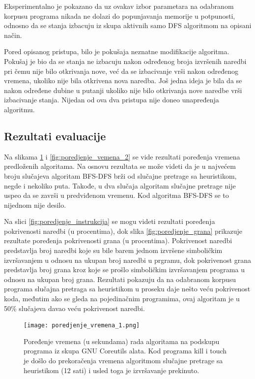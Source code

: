 \documentclass[12pt,oneside]{memoir}
\begin{document}
Eksperimentalno je pokazano da uz ovakav izbor parametara na odabranom korpusu programa nikada ne dolazi do popunjavanja memorije u potpunosti, odnosno da se stanja izbacuju iz skupa aktivnih samo DFS algoritmom na opisani način.

Pored opisanog pristupa, bilo je pokušaja neznatne modifikacije algoritma. Pokušaj je bio da se stanja ne izbacuju nakon određenog broja izvršenih naredbi pri čemu nije bilo otkrivanja nove, već da se izbacivanje vrši nakon određenog vremena, ukoliko nije bila otkrivena nova naredba. Još jedna ideja je bila da se nakon određene dubine u putanji ukoliko nije bilo otkrivanja nove naredbe vrši izbacivanje stanja. Nijedan od ova dva pristupa nije doneo unapređenja algoritmu.

\subsection{Rezultati evaluacije}

Na slikama \ref{fig:poredjenje_vemena_1} i \ref{fig:poredjenje_vemena_2} se vide rezultati poređenja vremena predloženih algoritama. Na osnovu rezultata se može videti da je u najvećem broju slučajeva algoritam BFS-DFS brži od slučajne pretrage sa heuristikom, negde i nekoliko puta. Takođe, u dva slučaja algoritam slučajne pretrage nije uspeo da se završi u predviđenom vremenu. Kod algoritma BFS-DFS se to nijednom nije desilo. 

Na slici \ref{fig:poredjenje_instrukcija} se mogu videti rezultati poređenja pokrivenosti naredbi (u procentima), dok slika \ref{fig:poredjenje_grana} prikazuje rezultate poređenja pokrivenosti grana (u procentima). Pokrivenost naredbi predstavlja broj naredbi koje su bile barem jednom izvršene simboličkim izvršavanjem u odnosu na ukupan broj naredbi u prgramu, dok pokrivenost grana predstavlja broj grana kroz koje se prošlo simboličkim izvršavanjem programa u odnosu na ukupan broj grana. Rezultati pokazuju da na odabranom korpusu programa slučajna pretraga sa heuristikom u proseku daje nešto veću pokrivenost koda, međutim ako se gleda na pojedinačnim programima, ovaj algoritam je u 50\% slučajeva davao veću pokrivenost naredbi.

\begin{figure}[H]
    \centering
    \texttt{[image: poredjenje\_vremena\_1.png]}
    \caption{Poređenje vremena (u sekundama) rada algoritama na podskupu programa iz skupa GNU Coreutils alata. Kod programa kill i touch je došlo do prekoračenja vremena algoritmom slučajne pretrage sa heuristikom (12 sati) i usled toga je izvršavanje prekinuto.}
    \label{fig:poredjenje_vemena_1}
\end{figure}
\end{document}
